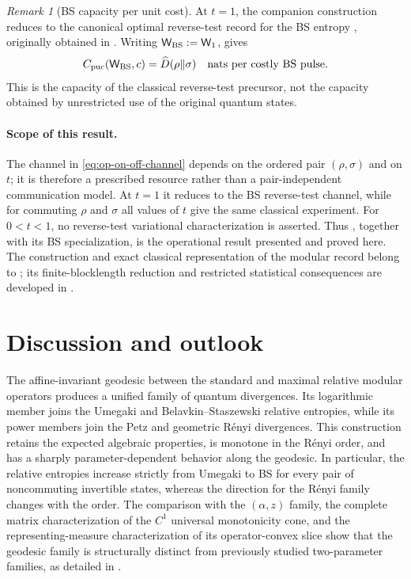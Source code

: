\documentclass[11pt]{article}
\theoremstyle{remark}
\newtheorem{remark}[remark]{Remark}
\newcommand{\1}{\mathbbm{1}}
\begin{document}
\begin{remark}[BS capacity per unit cost]
At $t=1$, the companion construction reduces to the canonical optimal
reverse-test record for the BS entropy
\cite[Section~3.1, Eqs.~(57)--(58)]{capel2026informationgeometry},
originally obtained in \cite{matsumoto2010reverse}.  Writing
$\mathsf W_{\rm BS}:=\mathsf W_1$,  gives
\begin{equation}
 C_{\rm puc}(\mathsf W_{\rm BS},c)=\widehat D(\rho\Vert\sigma)
 \quad\text{nats per costly BS pulse}.
 \label{eq:op-BS-capacity}
\end{equation}
This is the capacity of the classical reverse-test precursor, not the
capacity obtained by unrestricted use of the original quantum states.
\end{remark}

\paragraph{Scope of this result.}
The channel in \eqref{eq:op-on-off-channel} depends on the ordered pair
$(\rho,\sigma)$ and on $t$; it is therefore a prescribed resource rather
than a pair-independent communication model.  At $t=1$ it reduces to
the BS reverse-test channel, while for commuting $\rho$ and $\sigma$ all
values of $t$ give the same classical experiment.  For $0<t<1$, no
reverse-test variational characterization is asserted.  Thus
, together with its BS specialization, is the
operational result presented and proved here.  The construction and
exact classical representation of the modular record belong to
\cite[Theorem~3.1]{capel2026informationgeometry}; its finite-blocklength
reduction and restricted statistical consequences are developed in
\cite[Propositions~3.2--3.3]{capel2026informationgeometry}.

\section{Discussion and outlook}
\label{sec:discussion-outlook}


The affine-invariant geodesic between the standard and maximal
relative modular operators produces a unified family of quantum
divergences.  Its logarithmic member joins the Umegaki and
Belavkin--Staszewski relative entropies, while its power members join
the Petz and geometric R\'enyi divergences.  This construction retains
the expected algebraic properties, is monotone in the R\'enyi order,
and has a sharply parameter-dependent behavior along the geodesic.
In particular, the relative entropies increase strictly from Umegaki
to BS for every pair of noncommuting invertible states, whereas the direction for
the R\'enyi family changes with the order.  The comparison with the
$(\alpha,z)$ family, the complete matrix characterization of the
$C^1$ universal monotonicity cone, and the representing-measure
characterization of its operator-convex slice show that the
geodesic family is structurally distinct from previously studied
two-parameter families, as detailed in
.
\end{document}
